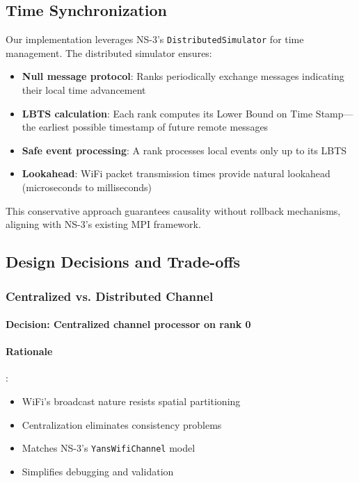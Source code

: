 \subsection{Time Synchronization}

Our implementation leverages NS-3's \texttt{DistributedSimulator} for time management. The distributed simulator ensures:

\begin{itemize}
    \item \textbf{Null message protocol}: Ranks periodically exchange messages indicating their local time advancement
    \item \textbf{LBTS calculation}: Each rank computes its Lower Bound on Time Stamp—the earliest possible timestamp of future remote messages
    \item \textbf{Safe event processing}: A rank processes local events only up to its LBTS
    \item \textbf{Lookahead}: WiFi packet transmission times provide natural lookahead (microseconds to milliseconds)
\end{itemize}

This conservative approach guarantees causality without rollback mechanisms, aligning with NS-3's existing MPI framework.

\subsection{Design Decisions and Trade-offs}

\subsubsection{Centralized vs. Distributed Channel}

\paragraph{Decision: Centralized channel processor on rank 0}

\paragraph{Rationale}:
\begin{itemize}
    \item WiFi's broadcast nature resists spatial partitioning
    \item Centralization eliminates consistency problems
    \item Matches NS-3's \texttt{YansWifiChannel} model
    \item Simplifies debugging and validation
\end{itemize}

